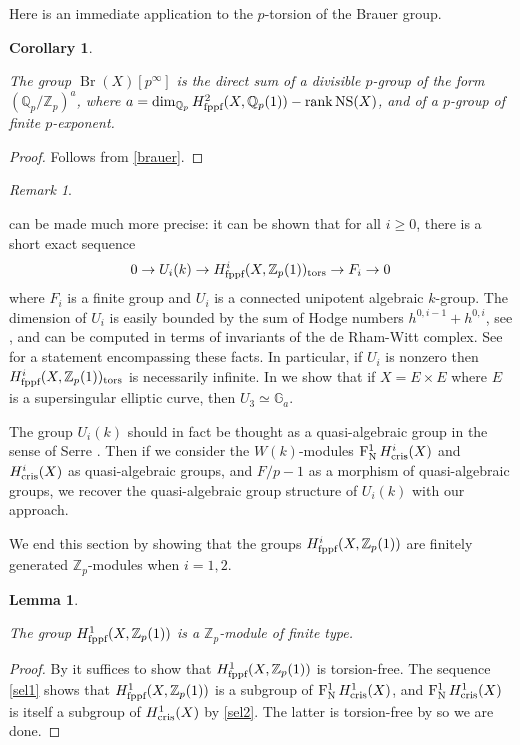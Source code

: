 \documentclass[11pt]{article}
\theoremstyle{plain}
\newtheorem{Cor}[Thm]{Corollary}
\newtheorem{Lem}[Thm]{Lemma}
\theoremstyle{definition}
\theoremstyle{remark}
\newtheorem{Rem}[Thm]{Remark}
\numberwithin{equation}{section}
\newenvironment{lemma}[1]%
    { \begin{Lem} \label{L:#1}}%
    { \end{Lem} }
\newcommand{\lem}[1]{\begin{lemma}{#1} \sl}
\newcommand{\elem}{\end{lemma}}
\newenvironment{corol}[1]%
    { \begin{Cor} \label{C:#1}}%
    { \end{Cor} }
\newcommand{\cor}[1]{\begin{corol}{#1} \sl }
\newcommand{\ecor}{\end{corol}}
\newenvironment{remark}[1]%
    { \begin{Rem} \label{R:#1}}%
    { \end{Rem} }
\newcommand{\rem}[1]{\begin{remark}{#1}}
\newcommand{\erem}{\end{remark}}
\newcommand{\prf}{ \begin{proof} }
\newcommand{\epr}{ \end{proof} }
\newcommand{\Ga}{\mathbb{G}_a}
\newcommand{\Zp}{\mathbb{Z}_p}
\newcommand{\Qp}{\mathbb{Q}_p}
\DeclareMathOperator{\rk}{rank}                                          %
\newcommand{\W}{W}                                                       %
\DeclareMathOperator{\Br}{Br}                                            %
\DeclareMathOperator{\NS}{NS}
\newcommand\Hflat[1]{H^{#1}_{\textnormal{fppf}}}                         %
\DeclareMathOperator{\Nyg}{F_N^1}                                      %
\newcommand\Hcris[1]{H^{#1}_{\textnormal{cris}}}                         %
\begin{document}
Here is an immediate application to the $p$-torsion of the Brauer group.

\cor{finitebrauer}

The group $\Br(X)[p^{\infty}]$ is the direct sum of a divisible $p$-group of 
the form $\left(\Qp/\Zp\right)^a$, where $a=\dim_{\Qp}\Hflat{2}(X,\Qp(1))-\rk\NS(X)$, 
and of a $p$-group of finite $p$-exponent.

\ecor

\prf

Follows from \eqref{brauer}.\epr

\rem{unipotente}

 can be made much more precise: it can be shown that for all $i\ge0$, there is a short exact sequence
\[
0\to U_i(k)\to\Hflat{i}(X,\Zp(1))_{\text{tors}}\to F_i\to0
\]
where $F_i$ is a finite group and $U_i$ is a connected unipotent algebraic $k$-group. The dimension of $U_i$ is easily bounded by the sum of Hodge numbers $h^{0,i-1}+h^{0,i}$, see \cite[p.554]{artinssk3}, and can be computed in terms of invariants of the de Rham-Witt complex. See \cite[IV.3.3]{illusieraynaud} for a statement encompassing these facts. In particular, if $U_i$ is nonzero then $\Hflat{i}(X,\Zp(1))_{\text{tors}}$ is necessarily infinite. In  we show that if $X=E\times E$ where $E$ is a supersingular elliptic curve, then $U_3\simeq\Ga$.

The group $U_i(k)$ should in fact be thought as a quasi-algebraic group in the sense of Serre \cite{serrequasialg}. Then if we consider the $\W(k)$-modules $\Nyg{}\Hcris{i}(X)$ and $\Hcris{i}(X)$ as quasi-algebraic groups, and $F/p-1$ as a morphism of quasi-algebraic groups, we recover the quasi-algebraic group structure of $U_i(k)$ with our approach.
\erem

We end this section by showing that the groups $\Hflat{i}(X,\Zp(1))$ are finitely generated $\Zp$-modules when $i=1,2$.

\lem{finitedegreeone}

The group $\Hflat{1}(X,\Zp(1))$ is a $\Zp$-module of finite type.

\elem

\prf
By  it suffices to show that $\Hflat{1}(X,\Zp(1))$ is torsion-free. The sequence \eqref{sel1} shows that $\Hflat{1}(X,\Zp(1))$ is a subgroup of $\Nyg{}\Hcris{1}(X)$, and $\Nyg{}\Hcris{1}(X)$ is itself a subgroup of $\Hcris{1}(X)$ by \eqref{sel2}. The latter is torsion-free by  so we are done.
\epr
\end{document}

